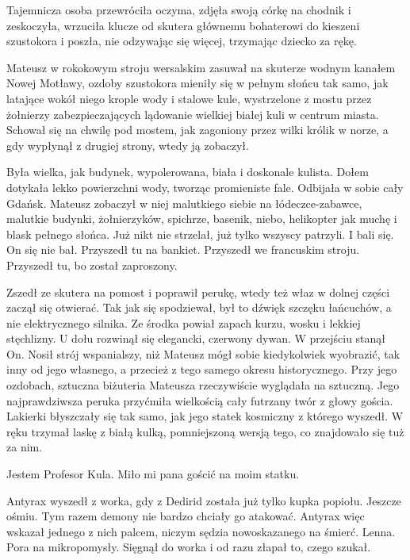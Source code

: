 Tajemnicza osoba przewróciła oczyma, zdjęła swoją córkę na chodnik i zeskoczyła, wrzuciła klucze od skutera głównemu bohaterowi do kieszeni szustokora i poszła, nie odzywając się więcej, trzymając dziecko za rękę.

Mateusz w rokokowym stroju wersalskim zasuwał na skuterze wodnym kanałem Nowej Motławy, ozdoby szustokora mieniły się w pełnym słońcu tak samo, jak latające wokół niego
krople wody i stalowe kule, wystrzelone z mostu przez żołnierzy zabezpieczających
lądowanie wielkiej białej kuli w centrum miasta.
Schował się na chwilę pod mostem, jak zagoniony przez wilki królik w norze, a gdy wypłynął z drugiej strony, wtedy ją zobaczył.

Była wielka, jak budynek, wypolerowana, biała i doskonale kulista.
Dołem dotykała lekko powierzchni wody, tworząc promieniste fale.
Odbijała w sobie cały Gdańsk.
Mateusz zobaczył w niej malutkiego siebie na łódeczce-zabawce, malutkie budynki, żołnierzyków, spichrze, basenik, niebo, helikopter jak muchę i blask pełnego słońca.
Już nikt nie strzelał, już tylko wszyscy patrzyli. I bali się.
On się nie bał. Przyszedł tu na bankiet.
Przyszedł we francuskim stroju.
Przyszedł tu, bo został zaproszony.

Zszedł ze skutera na pomost i poprawił perukę, wtedy też właz w dolnej części zaczął się otwierać.
Tak jak się spodziewał, był to dźwięk szczęku łańcuchów, a nie elektrycznego silnika.
Ze środka powiał zapach kurzu, wosku i lekkiej stęchlizny.
U dołu rozwinął się elegancki, czerwony dywan.
W przejściu stanął On.
Nosił strój wspanialszy, niż Mateusz mógł sobie kiedykolwiek wyobrazić, tak inny od jego własnego, a przecież z tego samego okresu historycznego.
Przy jego ozdobach, sztuczna biżuteria Mateusza rzeczywiście wyglądała na sztuczną.
Jego najprawdziwsza peruka przyćmiła wielkością cały futrzany twór z głowy gościa.
Lakierki błyszczały się tak samo, jak jego statek kosmiczny z którego wyszedł.
W ręku trzymał laskę z białą kulką, pomniejszoną wersją tego, co znajdowało się tuż za nim.

\begin{dialogue}
\ds{} Jestem Profesor Kula. Miło mi pana gościć na moim statku.
\end{dialogue}

\divider{}

Antyrax wyszedł z worka, gdy z Dedirid została już tylko kupka popiołu.
Jeszcze ośmiu.
Tym razem demony nie bardzo chciały go atakować.
Antyrax więc wskazał jednego z nich palcem, niczym sędzia nowoskazanego na śmierć.
Lenna. Pora na mikropomysły.
Sięgnął do worka i od razu złapał to, czego szukał.

